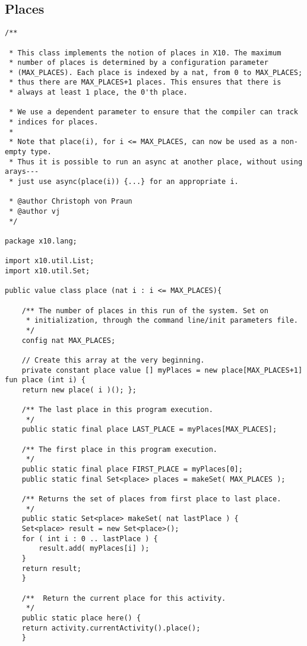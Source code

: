 \subsection{Places}
{\footnotesize
\begin{verbatim}
/**

 * This class implements the notion of places in X10. The maximum
 * number of places is determined by a configuration parameter
 * (MAX_PLACES). Each place is indexed by a nat, from 0 to MAX_PLACES;
 * thus there are MAX_PLACES+1 places. This ensures that there is
 * always at least 1 place, the 0'th place.

 * We use a dependent parameter to ensure that the compiler can track
 * indices for places.
 *
 * Note that place(i), for i <= MAX_PLACES, can now be used as a non-empty type.
 * Thus it is possible to run an async at another place, without using arays---
 * just use async(place(i)) {...} for an appropriate i.

 * @author Christoph von Praun
 * @author vj
 */

package x10.lang;

import x10.util.List;
import x10.util.Set;

public value class place (nat i : i <= MAX_PLACES){

    /** The number of places in this run of the system. Set on
     * initialization, through the command line/init parameters file.
     */
    config nat MAX_PLACES;

    // Create this array at the very beginning.
    private constant place value [] myPlaces = new place[MAX_PLACES+1] fun place (int i) {
	return new place( i )(); };

    /** The last place in this program execution.
     */
    public static final place LAST_PLACE = myPlaces[MAX_PLACES];

    /** The first place in this program execution.
     */
    public static final place FIRST_PLACE = myPlaces[0];
    public static final Set<place> places = makeSet( MAX_PLACES );

    /** Returns the set of places from first place to last place.
     */
    public static Set<place> makeSet( nat lastPlace ) {
	Set<place> result = new Set<place>();
	for ( int i : 0 .. lastPlace ) {
	    result.add( myPlaces[i] );
	}
	return result;
    }

    /**  Return the current place for this activity.
     */
    public static place here() {
	return activity.currentActivity().place();
    }


\end{verbatim}}
